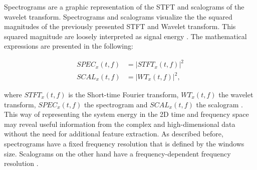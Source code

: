  Spectrograms are a graphic representation of the STFT and scalograms of the wavelet transform. Spectrograms and scalograms visualize the the squared magnitudes of the previously presented STFT and Wavelet transform. This squared magnitude are loosely interpreted as signal energy \cite{Hlawatsch1992}. The mathematical expressions are presented in the following: 

\begin{equation}
    \begin{aligned}
        SPEC_{x}(t,f) &= |STFT_{x}(t,f)|^{2} \\
        SCAL_{x}(t,f) &= |WT_{x}(t,f)|^{2}, 
    \end{aligned}
\end{equation}

where $STFT_{x}(t,f)$ is the Short-time Fourier transform, $WT_{x}(t,f)$ the wavelet transform, $SPEC_{x}(t,f)$ the spectrogram and $SCAL_{x}(t,f)$ the scalogram \cite{Hlawatsch1992}. This way of representing the system energy in the 2D time and frequency space may reveal useful information from the complex and high-dimensional data without the need for additional feature extraction. As described before, spectrograms have a fixed frequency resolution that is defined by the windows size. Scalograms on the other hand have a frequency-dependent frequency resolution \cite{Verstraete2017}.



